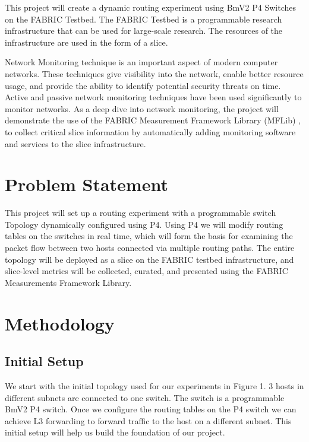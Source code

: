 \documentclass[conference]{IEEEtran}
\begin{document}
    This project will create a dynamic routing experiment using BmV2 P4 Switches on the FABRIC Testbed. The FABRIC Testbed is a programmable research infrastructure that can be used for large-scale research. The resources of the infrastructure are used in the form of a slice.

    Network Monitoring technique is an important aspect of modern computer networks. These techniques give visibility into the network, enable better resource usage, and provide the ability to identify potential security threats on time. Active and passive network monitoring techniques have been used significantly to monitor networks. As a deep dive into network monitoring, the project will demonstrate the use of the FABRIC Measurement Framework Library (MFLib) \cite{b3}, to collect critical slice information by automatically adding monitoring software and services to the slice infrastructure.


    \section{Problem Statement}
    This project will set up a routing experiment with a programmable switch Topology dynamically configured using P4. Using P4 we will modify routing tables on the switches in real time, which will form the basis for examining the packet flow between two hosts connected via multiple routing paths. The entire topology will be deployed as a slice on the FABRIC testbed infrastructure, and slice-level metrics will be collected, curated, and presented using the FABRIC Measurements Framework Library. \\


    \section{Methodology}

    \subsection{Initial Setup}
    We start with the initial topology used for our experiments in Figure 1. 3 hosts in different subnets are connected to one switch. The switch is a programmable BmV2 P4 switch. Once we configure the routing tables on the P4 switch we can achieve L3 forwarding to forward traffic to the host on a different subnet. This initial setup will help us build the foundation of our project.
\end{document}
